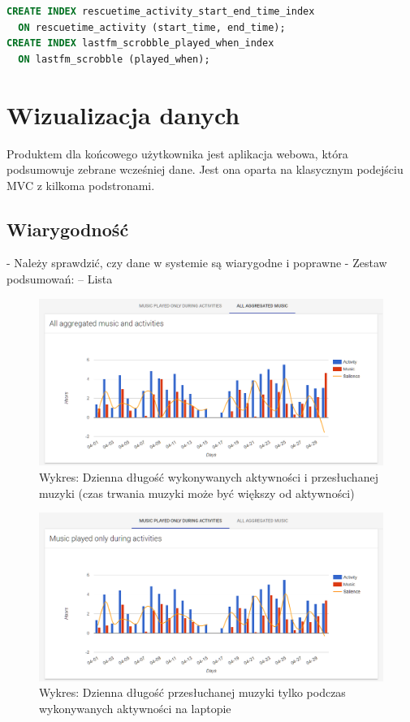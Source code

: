 \documentclass[brudnopis]{xmgr}
\begin{document}
\begin{lstlisting}[language=sql]
CREATE INDEX rescuetime_activity_start_end_time_index
  ON rescuetime_activity (start_time, end_time);
CREATE INDEX lastfm_scrobble_played_when_index
  ON lastfm_scrobble (played_when);
\end{lstlisting}

\chapter{Wizualizacja danych}

    Produktem dla końcowego użytkownika jest aplikacja webowa, która podsumowuje zebrane wcześniej dane.
    Jest ona oparta na klasycznym podejściu MVC z kilkoma podstronami.

    \section{Wiarygodność}

    - Należy sprawdzić, czy dane w systemie są wiarygodne i poprawne
    - Zestaw podsumowań:
    -- Lista

    \begin{figure}
        \includegraphics[width=\linewidth]{fig/ui/chart-music-all.png}
        \caption{Wykres: Dzienna długość wykonywanych aktywności i przesłuchanej muzyki (czas trwania muzyki może być większy od aktywności)}
        \label{fig:Dzienny wykres całości przesłuchanej muzyki }
    \end{figure}

    \begin{figure}
        \includegraphics[width=\linewidth]{fig/ui/chart-music-only-during-activities.png}
        \caption{Wykres: Dzienna długość przesłuchanej muzyki tylko podczas wykonywanych aktywności na laptopie}
        \label{fig:ui:chart-music-only-during-activities}
    \end{figure}
\end{document}
